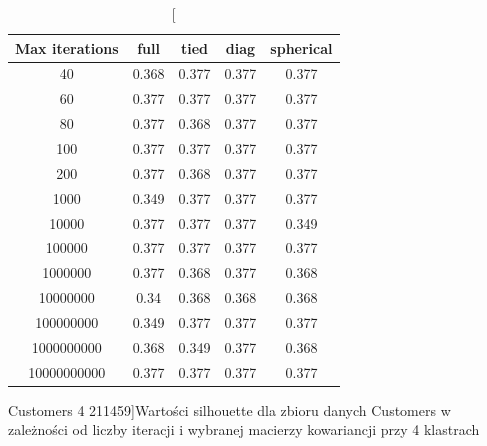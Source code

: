 \documentclass{classrep}
\begin{document}
{{            \begin{table}[!htbp]
                \begin{minipage}{1\textwidth}
                \centering
                \begin{tabular}{|c|c|c|c|c|}
                \hline
                Max iterations & full & tied & diag & spherical \\ \hline
                40 & 0.368 & 0.377 & 0.377 & 0.377 \\ \hline
                60 & 0.377 & 0.377 & 0.377 & 0.377 \\ \hline
                80 & 0.377 & 0.368 & 0.377 & 0.377 \\ \hline
                100 & 0.377 & 0.377 & 0.377 & 0.377 \\ \hline
                200 & 0.377 & 0.368 & 0.377 & 0.377 \\ \hline
                1000 & 0.349 & 0.377 & 0.377 & 0.377 \\ \hline
                10000 & 0.377 & 0.377 & 0.377 & 0.349 \\ \hline
                100000 & 0.377 & 0.377 & 0.377 & 0.377 \\ \hline
                1000000 & 0.377 & 0.368 & 0.377 & 0.368 \\ \hline
                10000000 & 0.34 & 0.368 & 0.368 & 0.368 \\ \hline
                100000000 & 0.349 & 0.377 & 0.377 & 0.377 \\ \hline
                1000000000 & 0.368 & 0.349 & 0.377 & 0.368 \\ \hline
                10000000000 & 0.377 & 0.377 & 0.377 & 0.377 \\ \hline
                \end{tabular}
                \caption
                [Customers 4 211459]{Wartości silhouette dla zbioru danych Customers w zależności od liczby iteracji i wybranej macierzy kowariancji przy 4 klastrach}
                \label{Customers_4_211459}
                \end{minipage}
                \hfill
                

\end{table}}}
\end{document}
